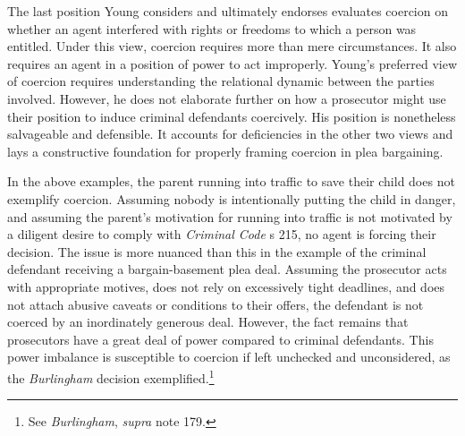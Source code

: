 The last position Young considers and ultimately endorses evaluates coercion on whether an agent interfered with rights or freedoms to which a person was entitled. Under this view, coercion requires more than mere circumstances. It also requires an agent in a position of power to act improperly. Young's preferred view of coercion requires understanding the relational dynamic between the parties involved. However, he does not elaborate further on how a prosecutor might use their position to induce criminal defendants coercively. His position is nonetheless salvageable and defensible. It accounts for deficiencies in the other two views and lays a constructive foundation for properly framing coercion in plea bargaining.

In the above examples, the parent running into traffic to save their child does not exemplify coercion. Assuming nobody is intentionally putting the child in danger, and assuming the parent's motivation for running into traffic is not motivated by a diligent desire to comply with \textit{Criminal Code} s 215, no agent is forcing their decision. The issue is more nuanced than this in the example of the criminal defendant receiving a bargain-basement plea deal. Assuming the prosecutor acts with appropriate motives, does not rely on excessively tight deadlines, and does not attach abusive caveats or conditions to their offers, the defendant is not coerced by an inordinately generous deal. However, the fact remains that prosecutors have a great deal of power compared to criminal defendants. This power imbalance is susceptible to coercion if left unchecked and unconsidered, as the \textit{Burlingham} decision exemplified.\footnote{See \textit{Burlingham}, \textit{supra} note 179.}

